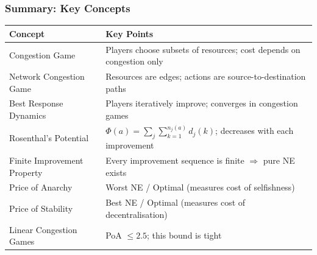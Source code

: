 \subsubsection{Summary: Key Concepts}

\begin{center}
\renewcommand{\arraystretch}{1.4}
\begin{tabular}{@{} l p{9.5cm} @{}}
\toprule
\textbf{Concept} & \textbf{Key Points} \\
\midrule
Congestion Game & Players choose subsets of resources; cost depends on congestion only \\
Network Congestion Game & Resources are edges; actions are source-to-destination paths \\
Best Response Dynamics & Players iteratively improve; converges in congestion games \\
Rosenthal's Potential & $\Phi(a) = \sum_j \sum_{k=1}^{n_j(a)} d_j(k)$; decreases with each improvement \\
Finite Improvement Property & Every improvement sequence is finite $\Rightarrow$ pure NE exists \\
Price of Anarchy & Worst NE / Optimal (measures cost of selfishness) \\
Price of Stability & Best NE / Optimal (measures cost of decentralisation) \\
Linear Congestion Games & PoA $\leq 2.5$; this bound is tight \\
\bottomrule
\end{tabular}
\end{center}
